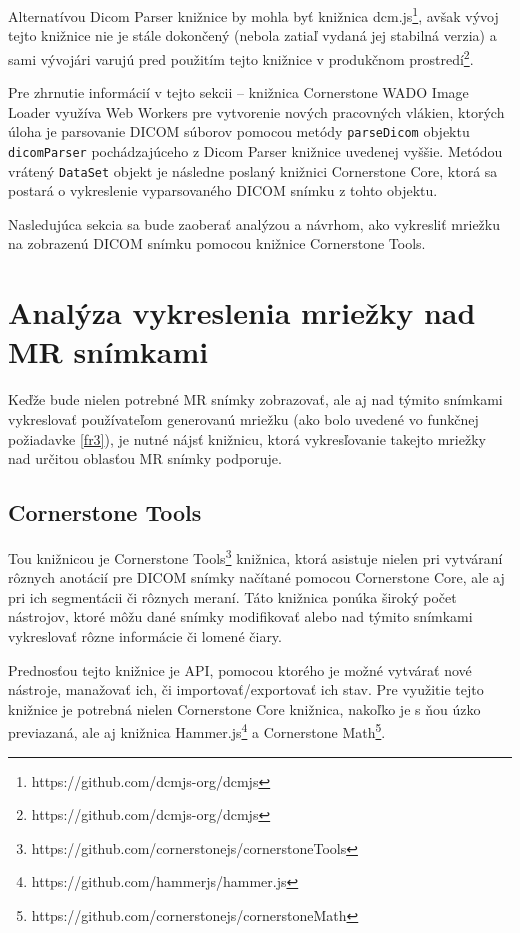 Alternatívou Dicom Parser knižnice by mohla byť knižnica dcm.js\footnote{https://github.com/dcmjs-org/dcmjs}, avšak vývoj tejto knižnice nie je stále dokončený (nebola zatiaľ vydaná jej stabilná verzia) a sami vývojári varujú pred použitím tejto knižnice v produkčnom prostredí\footnote{https://github.com/dcmjs-org/dcmjs}.

Pre zhrnutie informácií v tejto sekcii -- knižnica Cornerstone WADO Image Loader využíva Web Workers pre vytvorenie nových pracovných vlákien, ktorých úloha je parsovanie DICOM súborov pomocou metódy \newline \texttt{parseDicom} objektu \texttt{dicomParser} pochádzajúceho z Dicom Parser knižnice uvedenej vyššie. Metódou vrátený \texttt{DataSet} objekt je následne poslaný knižnici Cornerstone Core, ktorá sa postará o vykreslenie vyparsovaného DICOM snímku z tohto objektu.

Nasledujúca sekcia sa bude zaoberať analýzou a návrhom, ako vykresliť mriežku na zobrazenú DICOM snímku pomocou knižnice Cornerstone Tools.

\section {Analýza vykreslenia mriežky nad MR snímkami}
Keďže bude nielen potrebné MR snímky zobrazovať, ale aj nad týmito snímkami vykreslovať používateľom generovanú mriežku (ako bolo uvedené vo funkčnej požiadavke \ref{fr3}), je nutné nájsť knižnicu, ktorá vykresľovanie takejto mriežky nad určitou oblasťou MR snímky podporuje.

\subsection {Cornerstone Tools}
Tou knižnicou je Cornerstone Tools\footnote{https://github.com/cornerstonejs/cornerstoneTools} knižnica, ktorá asistuje nielen pri vytváraní rôznych anotácií pre DICOM snímky načítané pomocou Cornerstone Core, ale aj pri ich segmentácii či rôznych meraní. Táto knižnica ponúka široký počet nástrojov, ktoré môžu dané snímky modifikovať alebo nad týmito snímkami vykreslovať rôzne informácie či lomené čiary.

Prednosťou tejto knižnice je API, pomocou ktorého je možné vytvárať nové nástroje, manažovať ich, či importovať/exportovať ich stav. Pre využitie tejto knižnice je potrebná nielen Cornerstone Core knižnica, nakoľko je s ňou úzko previazaná, ale aj knižnica Hammer.js\footnote{https://github.com/hammerjs/hammer.js} a Cornerstone Math\footnote{https://github.com/cornerstonejs/cornerstoneMath}.

